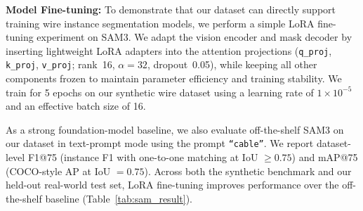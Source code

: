 \documentclass[letterpaper, 10 pt, conference]{ieeeconf}  %
\begin{document}





\noindent\textbf{Model Fine-tuning:}
To demonstrate that our dataset can directly support training wire instance segmentation models, we perform a simple LoRA fine-tuning experiment on SAM3. We adapt the vision encoder and mask decoder by inserting lightweight LoRA adapters into the attention projections (\texttt{q\_proj}, \texttt{k\_proj}, \texttt{v\_proj}; rank~16, $\alpha=32$, dropout~0.05), while keeping all other components frozen to maintain parameter efficiency and training stability. We train for 5 epochs on our synthetic wire dataset using a learning rate of $1\times10^{-5}$ and an effective batch size of 16.

As a strong foundation-model baseline, we also evaluate off-the-shelf SAM3 on our dataset in text-prompt mode using the prompt \texttt{``cable''}. We report dataset-level F1@75 (instance F1 with one-to-one matching at IoU $\ge 0.75$) and mAP@75 (COCO-style AP at IoU $=0.75$). Across both the synthetic benchmark and our held-out real-world test set, LoRA fine-tuning improves performance over the off-the-shelf baseline (Table~\ref{tab:sam_result}).
\end{document}
